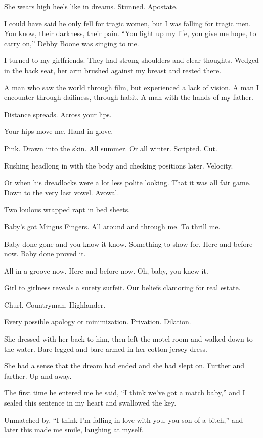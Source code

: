 \documentclass[
]{memoir}
\begin{document}
She wears high heels like in dreams. Stunned. Apostate.

I could have said he only fell for tragic women, but I was falling for
tragic men. You know, their darkness, their pain. ``You light up my
life, you give me hope, to carry on,'' Debby Boone was singing to me.

I turned to my girlfriends. They had strong shoulders and clear
thoughts. Wedged in the back seat, her arm brushed against my breast and
rested there.

A man who saw the world through film, but experienced a lack of vision.
A man I encounter through dailiness, through habit. A man with the hands
of my father.

Distance spreads. Across your lips.

Your hips move me. Hand in glove.

Pink. Drawn into the skin. All summer. Or all winter. Scripted. Cut.

Rushing headlong in with the body and checking positions later.
Velocity.

Or when his dreadlocks were a lot less polite looking. That it was all
fair game. Down to the very last vowel. Avowal.

Two loulous wrapped rapt in bed sheets.

Baby's got Mingus Fingers. All around and through me. To thrill me.

Baby done gone and you know it know. Something to show for. Here and
before now. Baby done proved it.

All in a groove now. Here and before now. Oh, baby, you knew it.

Girl to girlness reveals a surety surfeit. Our beliefs clamoring for
real estate.

Churl. Countryman. Highlander.

Every possible apology or minimization. Privation. Dilation.

She dressed with her back to him, then left the motel room and walked
down to the water. Bare-legged and bare-armed in her cotton jersey
dress.

She had a sense that the dream had ended and she had slept on. Further
and farther. Up and away.

The first time he entered me he said, ``I think we've got a match
baby,'' and I sealed this sentence in my heart and swallowed the key.

Unmatched by, ``I think I'm falling in love with you, you
son-of-a-bitch,'' and later this made me smile, laughing at myself.
\end{document}
